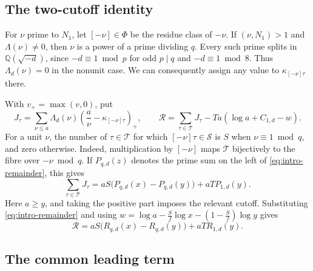 \documentclass[11pt,reqno]{amsart}
\theoremstyle{definition}
\numberwithin{equation}{section}
\newcommand{\QQ}{\mathbb Q}
\begin{document}
\subsection{The two-cutoff identity}

For \(\nu\) prime to \(N_1\), let \([-\nu]\in\Phi\) be the
residue class of \(-\nu\). If \((\nu,N_1)>1\) and
\(\Lambda(\nu)\ne0\), then \(\nu\) is a power of a prime dividing \(q\).
Every such prime splits in \(\QQ(\sqrt{-d})\), since
\(-d\equiv1\bmod p\) for odd \(p\mid q\) and \(-d\equiv1\bmod8\).
Thus \(\Lambda_d(\nu)=0\) in the nonunit case.
We can consequently assign any value to \(\kappa_{[-\nu]\tau}\)
there.

With \(v_+=\max(v,0)\), put
\[
 J_\tau=\sum_{\nu\le a}\Lambda_d(\nu)
             \left(\frac{a}{\nu}-\kappa_{[-\nu]\tau}\right)_+,
 \qquad
 \mathcal R=\sum_{\tau\in\mathcal T}J_\tau-
             Ta(\log a+C_{1,d}-w).
\]
For a unit \(\nu\), the number of \(\tau\in\mathcal T\) for which
\([-\nu]\tau\in\mathcal S\) is \(S\) when \(\nu\equiv1\bmod q\),
and zero otherwise. Indeed, multiplication by \([-\nu]\) maps
\(\mathcal T\) bijectively to the fibre over \(-\nu\bmod q\).
If \(P_{q,d}(z)\) denotes the prime sum on the left of
\eqref{eq:intro-remainder}, this gives
\[
 \sum_{\tau\in\mathcal T}J_\tau
 =aS\bigl(P_{q,d}(x)-P_{q,d}(y)\bigr)+aT P_{1,d}(y).
\]
Here \(a\ge y\), and taking the positive part imposes the relevant
cutoff. Substituting \eqref{eq:intro-remainder} and using
\(w=\log a-\frac{S}{f}\log x-(1-\frac{S}{f})\log y\) gives
\begin{equation}\label{eq:two-weights}
 \mathcal R=aS\bigl(R_{q,d}(x)-R_{q,d}(y)\bigr)+aT R_{1,d}(y).
\end{equation}

\subsection{The common leading term}
\end{document}
